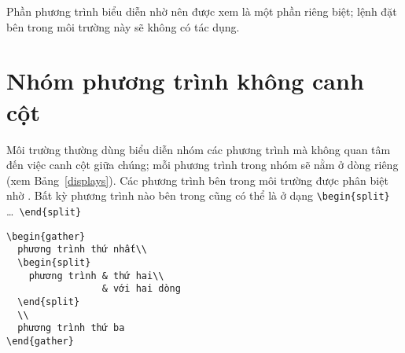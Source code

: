 Phần phương trình biểu diễn nhờ 
nên được xem là một phần riêng biệt;
lệnh  đặt bên trong môi trường này sẽ không có tác dụng.

\section{Nhóm phương trình không canh cột}

Môi trường  thường dùng biểu diễn nhóm các phương trình
mà không quan tâm đến việc canh cột giữa chúng; mỗi phương trình trong nhóm
sẽ nằm ở dòng riêng (xem Bảng~\ref{displays}). Các phương trình bên trong
môi trường  được phân biệt nhờ \cn{\\}. Bất kỳ phương trình
nào bên trong  cũng có thể là ở dạng
\verb'\begin{split}' \dots\ \verb'\end{split}'
\begin{verbatim}
\begin{gather}
  phương trình thứ nhất\\
  \begin{split}
    phương trình & thứ hai\\
                 & với hai dòng
  \end{split}
  \\
  phương trình thứ ba
\end{gather}
\end{verbatim}

